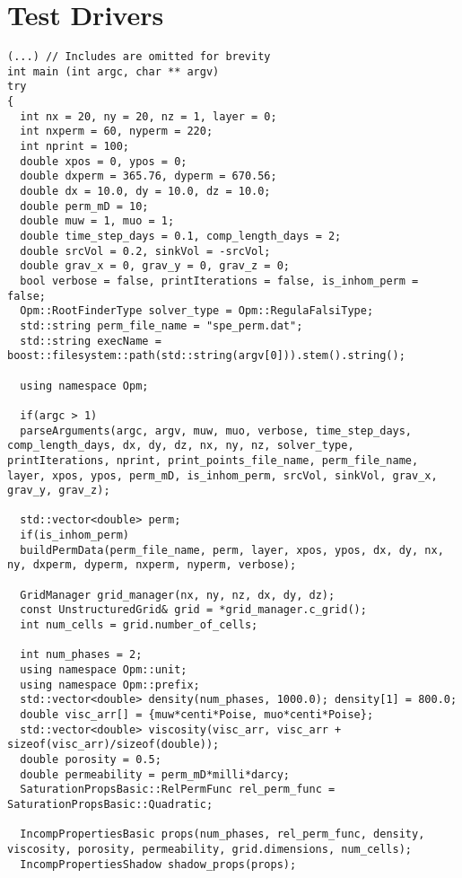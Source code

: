 \chapter{Test Drivers}
\label{appendix:test_driver}

\begin{lstlisting}[caption={The C++ program used to run the 2D numerical tests in Chapter \ref{chapter:numerical_results}},label={listing:test_driver_2D}]
(...) // Includes are omitted for brevity
int main (int argc, char ** argv)
try
{
  int nx = 20, ny = 20, nz = 1, layer = 0;
  int nxperm = 60, nyperm = 220;
  int nprint = 100;
  double xpos = 0, ypos = 0;
  double dxperm = 365.76, dyperm = 670.56;
  double dx = 10.0, dy = 10.0, dz = 10.0;
  double perm_mD = 10;
  double muw = 1, muo = 1;
  double time_step_days = 0.1, comp_length_days = 2;
  double srcVol = 0.2, sinkVol = -srcVol;
  double grav_x = 0, grav_y = 0, grav_z = 0;
  bool verbose = false, printIterations = false, is_inhom_perm = false;
  Opm::RootFinderType solver_type = Opm::RegulaFalsiType;
  std::string perm_file_name = "spe_perm.dat";
  std::string execName = boost::filesystem::path(std::string(argv[0])).stem().string();
  
  using namespace Opm;
  
  if(argc > 1)
  parseArguments(argc, argv, muw, muo, verbose, time_step_days, comp_length_days, dx, dy, dz, nx, ny, nz, solver_type, printIterations, nprint, print_points_file_name, perm_file_name, layer, xpos, ypos, perm_mD, is_inhom_perm, srcVol, sinkVol, grav_x, grav_y, grav_z);
  
  std::vector<double> perm;
  if(is_inhom_perm)
  buildPermData(perm_file_name, perm, layer, xpos, ypos, dx, dy, nx, ny, dxperm, dyperm, nxperm, nyperm, verbose);
  
  GridManager grid_manager(nx, ny, nz, dx, dy, dz);
  const UnstructuredGrid& grid = *grid_manager.c_grid();
  int num_cells = grid.number_of_cells;
  
  int num_phases = 2;
  using namespace Opm::unit;
  using namespace Opm::prefix;
  std::vector<double> density(num_phases, 1000.0); density[1] = 800.0;
  double visc_arr[] = {muw*centi*Poise, muo*centi*Poise};
  std::vector<double> viscosity(visc_arr, visc_arr + sizeof(visc_arr)/sizeof(double));
  double porosity = 0.5;
  double permeability = perm_mD*milli*darcy;
  SaturationPropsBasic::RelPermFunc rel_perm_func = SaturationPropsBasic::Quadratic;
  
  IncompPropertiesBasic props(num_phases, rel_perm_func, density, viscosity, porosity, permeability, grid.dimensions, num_cells);
  IncompPropertiesShadow shadow_props(props);
  

\end{lstlisting}
